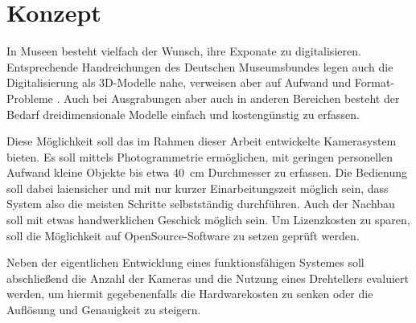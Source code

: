 \documentclass[./00_PhotoBox.tex]{subfiles}
\begin{document}
\chapter{Konzept}
In Museen besteht vielfach der Wunsch, ihre Exponate zu digitalisieren. Entsprechende Handreichungen des Deutschen Museumsbundes legen auch die Digitalisierung als 3D-Modelle nahe, verweisen aber auf Aufwand und Format-Probleme \citep[S. 43]{handreichung_digital}.
Auch bei Ausgrabungen aber auch in anderen Bereichen besteht der Bedarf dreidimensionale Modelle einfach und kostengünstig zu erfassen.

Diese Möglichkeit soll das im Rahmen dieser Arbeit entwickelte Kamerasystem bieten. Es soll mittels Photogrammetrie ermöglichen, mit geringen personellen Aufwand kleine Objekte bis etwa 40~cm Durchmesser zu erfassen. Die Bedienung soll dabei laiensicher und mit nur kurzer Einarbeitungszeit möglich sein, dass System also die meisten Schritte selbstständig durchführen. Auch der Nachbau soll mit etwas handwerklichen Geschick möglich sein. Um Lizenzkosten zu sparen, soll die Möglichkeit auf OpenSource-Software zu setzen geprüft werden.

Neben der eigentlichen Entwicklung eines funktionsfähigen Systemes soll abschließend die Anzahl der Kameras und die Nutzung eines Drehtellers evaluiert werden, um hiermit gegebenenfalls die Hardwarekosten zu senken oder die Auflösung und Genauigkeit zu steigern.

\biblio
\end{document}
